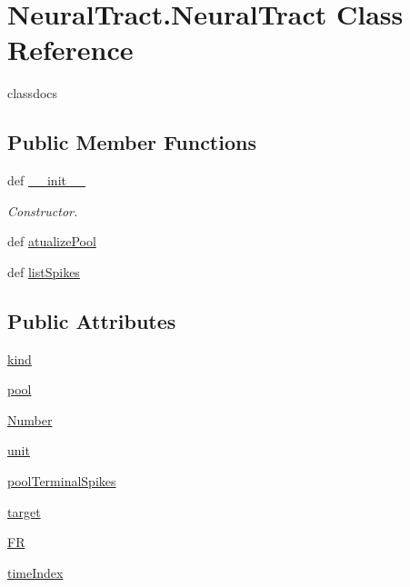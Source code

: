 \hypertarget{class_neural_tract_1_1_neural_tract}{\section{Neural\-Tract.\-Neural\-Tract Class Reference}
\label{class_neural_tract_1_1_neural_tract}
}


classdocs  


\subsection*{Public Member Functions}
\begin{DoxyCompactItemize}
\item 
def \hyperlink{class_neural_tract_1_1_neural_tract_a4bcd77ff91855685b0b96d3522ba7d20}{\-\_\-\-\_\-init\-\_\-\-\_\-}
\begin{DoxyCompactList}\small\item\em Constructor. \end{DoxyCompactList}\item 
def \hyperlink{class_neural_tract_1_1_neural_tract_a0f826ea8fadc13ea0af3bfdf5508b4f0}{atualize\-Pool}
\item 
def \hyperlink{class_neural_tract_1_1_neural_tract_a600b048655026f9271cec0a812b11dc4}{list\-Spikes}
\end{DoxyCompactItemize}
\subsection*{Public Attributes}
\begin{DoxyCompactItemize}
\item 
\hyperlink{class_neural_tract_1_1_neural_tract_af52b112c86e0c774fa204b7e2154b6aa}{kind}
\item 
\hyperlink{class_neural_tract_1_1_neural_tract_af0d232b9b86f3bae802b32777d0405d0}{pool}
\item 
\hyperlink{class_neural_tract_1_1_neural_tract_a9cf4c6df3fb8818e955817bb3ea9ffc4}{Number}
\item 
\hyperlink{class_neural_tract_1_1_neural_tract_a95db7d0720ec12f091758968476ba240}{unit}
\item 
\hyperlink{class_neural_tract_1_1_neural_tract_a1d104906ff30028e44e377a9e1ed5a3d}{pool\-Terminal\-Spikes}
\item 
\hyperlink{class_neural_tract_1_1_neural_tract_a637995fcac5bdd80ab1a9d4ea3de7f40}{target}
\item 
\hyperlink{class_neural_tract_1_1_neural_tract_aefbec14cba88a937841314d47f6056c0}{F\-R}
\item 
\hyperlink{class_neural_tract_1_1_neural_tract_adcda2b95aa86d4e7eebcc2557aee58cf}{time\-Index}
\end{DoxyCompactItemize}



